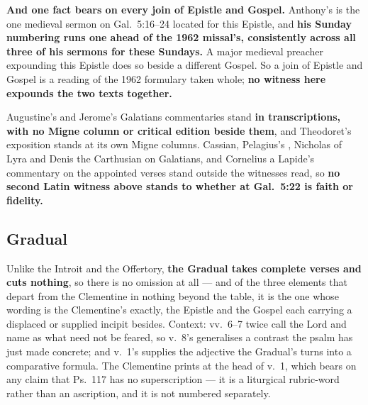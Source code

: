 \textbf{And one fact bears on every join of Epistle and Gospel.} Anthony's is
the one medieval sermon on Gal.\ 5:16--24 located for this Epistle,
and \textbf{his Sunday numbering runs one ahead of the 1962 missal's,
consistently across all three of his sermons for these Sundays.} A major
medieval preacher expounding this Epistle does so beside a different Gospel. So
a join of Epistle and Gospel is a reading of the 1962 formulary taken whole;
\textbf{no witness here expounds the two texts together.}

Augustine's and Jerome's Galatians commentaries stand \textbf{in
transcriptions, with no Migne column or critical edition beside them}, and
Theodoret's exposition stands at its own Migne columns. Cassian, Pelagius's
, Nicholas of Lyra and Denis the Carthusian on Galatians, and
Cornelius a Lapide's commentary on the appointed verses stand outside the
witnesses read, so \textbf{no second Latin witness above stands to whether  at
Gal.\ 5:22 is faith or fidelity.}

\elementguard
\subsection*{Gradual }


Unlike the Introit and the Offertory,
\textbf{the Gradual takes complete verses and cuts nothing}, so there is no
omission at all --- and of the three elements that depart from the Clementine in
nothing beyond the table, it is the one whose wording is the Clementine's
exactly, the Epistle and the Gospel each carrying a displaced or supplied
incipit besides. Context: vv.~6--7 twice call the
Lord  and name  as what need not be feared, so v.~8's
 generalises a contrast the psalm has just made
concrete; and v.~1's  supplies the adjective the Gradual's
 turns into a comparative formula. The Clementine
prints  at the head of v.~1, which bears on any claim that
Ps.~117 has no superscription --- it is a liturgical rubric-word rather than an
ascription, and it is not numbered separately.

